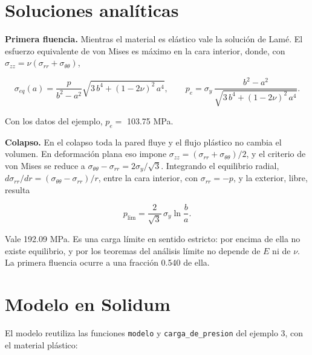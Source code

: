 \documentclass[11pt,oneside]{report}
\begin{document}
\section{Soluciones analíticas}

\textbf{Primera fluencia.} Mientras el material es elástico vale la solución de Lamé. El esfuerzo equivalente de von Mises es máximo en la cara interior, donde, con $\sigma_{zz} = \nu(\sigma_{rr} + \sigma_{\theta\theta})$,

\[
\sigma_{eq}(a) = \frac{p}{b^2 - a^2}\sqrt{3\,b^4 + (1 - 2\nu)^2\,a^4},
\qquad
p_e = \sigma_y\,\frac{b^2 - a^2}{\sqrt{3\,b^4 + (1 - 2\nu)^2\,a^4}} .
\]

Con los datos del ejemplo, $p_e =$ 103.75 MPa.

\textbf{Colapso.} En el colapso toda la pared fluye y el flujo plástico no cambia el volumen. En deformación plana eso impone $\sigma_{zz} = (\sigma_{rr} + \sigma_{\theta\theta})/2$, y el criterio de von Mises se reduce a $\sigma_{\theta\theta} - \sigma_{rr} = 2\sigma_y/\sqrt 3$. Integrando el equilibrio radial, $d\sigma_{rr}/dr = (\sigma_{\theta\theta} - \sigma_{rr})/r$, entre la cara interior, con $\sigma_{rr} = -p$, y la exterior, libre, resulta

\[
p_{\mathrm{lim}} = \frac{2}{\sqrt 3}\,\sigma_y \ln\frac{b}{a} .
\]

Vale 192.09 MPa. Es una carga límite en sentido estricto: por encima de ella no existe equilibrio, y por los teoremas del análisis límite no depende de $E$ ni de $\nu$. La primera fluencia ocurre a una fracción 0.540 de ella.

\section{Modelo en Solidum}

El modelo reutiliza las funciones \texttt{modelo} y \texttt{carga\_de\_presion} del ejemplo 3, con el material plástico:
\end{document}
